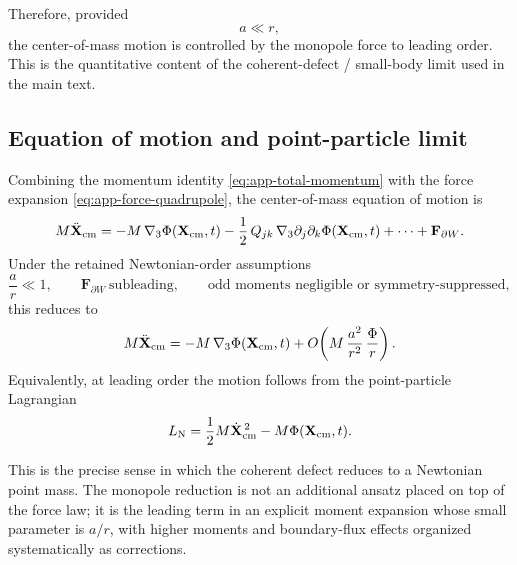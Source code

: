 \documentclass[11pt]{article}
\newcommand{\gradThree}{\nabla_3}
\newcommand{\PhiN}{\Phi}
\begin{document}
Therefore, provided
\begin{equation}
a\ll r,
\label{eq:app-small-body}
\end{equation}
the center-of-mass motion is controlled by the monopole force to leading order. This is
the quantitative content of the coherent-defect / small-body limit used in the main text.

\subsection{Equation of motion and point-particle limit}
\label{app:moments-eom}

Combining the momentum identity \eqref{eq:app-total-momentum} with the force expansion
\eqref{eq:app-force-quadrupole}, the center-of-mass equation of motion is
\begin{equation}
M\ddot{\mathbf X}_{\rm cm}
=
- M\,\gradThree\PhiN(\mathbf X_{\rm cm},t)
-\frac12\,Q_{jk}\,\gradThree\partial_j\partial_k\PhiN(\mathbf X_{\rm cm},t)
+\cdots
+\mathbf F_{\partial W}.
\label{eq:app-cm-eom-expanded}
\end{equation}
Under the retained Newtonian-order assumptions
\begin{equation}
\frac{a}{r}\ll 1,
\qquad
\mathbf F_{\partial W}\ \text{subleading},
\qquad
\text{odd moments negligible or symmetry-suppressed},
\label{eq:app-retained-assumptions}
\end{equation}
this reduces to
\begin{equation}
M\ddot{\mathbf X}_{\rm cm}
=
- M\,\gradThree\PhiN(\mathbf X_{\rm cm},t)
+
O\!\left(M\,\frac{a^2}{r^2}\,\frac{\PhiN}{r}\right).
\label{eq:app-cm-eom-mono}
\end{equation}
Equivalently, at leading order the motion follows from the point-particle Lagrangian
\begin{equation}
L_{\rm N}
=
\frac12 M\dot{\mathbf X}_{\rm cm}^{\,2}
-
M\PhiN(\mathbf X_{\rm cm},t).
\label{eq:app-point-particle-lag}
\end{equation}

This is the precise sense in which the coherent defect reduces to a Newtonian point mass.
The monopole reduction is not an additional ansatz placed on top of the force law; it is
the leading term in an explicit moment expansion whose small parameter is \(a/r\), with
higher moments and boundary-flux effects organized systematically as corrections.
\end{document}
